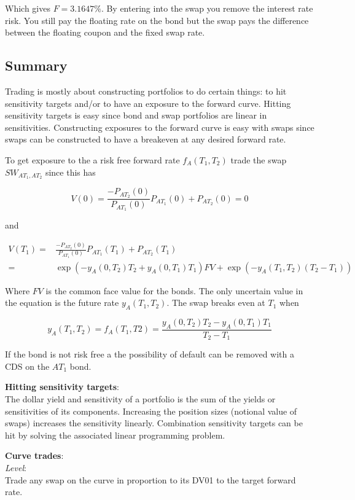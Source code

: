 Which gives $F=3.1647\%$. By entering into the swap you remove the interest rate risk. You still pay the floating rate on the bond but the swap pays the difference between the floating coupon and the fixed swap rate.


\subsection{Summary}

Trading is mostly about constructing portfolios to do certain things: to hit sensitivity targets and/or to have an exposure to the forward curve. Hitting sensitivity targets is easy since bond and swap portfolios are linear in sensitivities. Constructing exposures to the forward curve is easy with swaps since swaps can be constructed to have a breakeven at any desired forward rate.

To get exposure to the a risk free forward rate $f_A(T_1,T_2)$ trade the swap $SW_{AT_1,AT_2}$ since this has

\[V(0) = \frac{-P_{AT_2}(0)}{P_{AT_1}(0)}P_{AT_1}(0) +  P_{AT_2}(0) = 0  \]

and

\begin{eqnarray*}
V(T_1) =& \frac{-P_{AT_2}(0)}{P_{AT_1}(0)}P_{AT_1}(T_1)+  P_{AT_2}(T_1)  \\
=& \exp(-y_A(0,T_2)T_2 + y_A(0,T_1)T_1)FV + \exp(-y_A(T_1,T_2)(T_2-T_1))
\end{eqnarray*}

Where $FV$ is the common face value for the bonds. The only uncertain value in the equation is the future rate $y_A(T_1,T_2)$. The swap breaks even at $T_1$ when 

\[y_A(T_1,T_2) = f_A(T_1,T2) = \frac{y_A(0,T_2)T_2 - y_A(0,T_1)T_1}{T_2-T_1}\]

If the bond is not risk free a the possibility of default can be removed with a CDS on the $AT_1$ bond.


\textbf{Hitting sensitivity targets}:\\
The dollar yield and sensitivity of a portfolio is the sum of the yields or sensitivities of its components. Increasing the position sizes (notional value of swaps) increases the sensitivity linearly. Combination sensitivity targets can be hit by solving the associated linear programming problem.

\textbf{Curve trades}:\\

\textit{Level}:\\
Trade any swap on the curve in proportion to its DV01 to the target forward rate.


